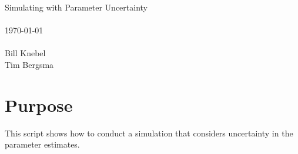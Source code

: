 
\usepackage{Sweave}

 

\vspace*{2cm}
\begin{center}
{\Large Simulating with Parameter Uncertainty}\\
~\\
\today\\
~\\
Bill Knebel\\
Tim Bergsma\\
\end{center}
\newpage

\section{Purpose}
This script shows how to conduct a simulation that
considers uncertainty in the parameter estimates.
